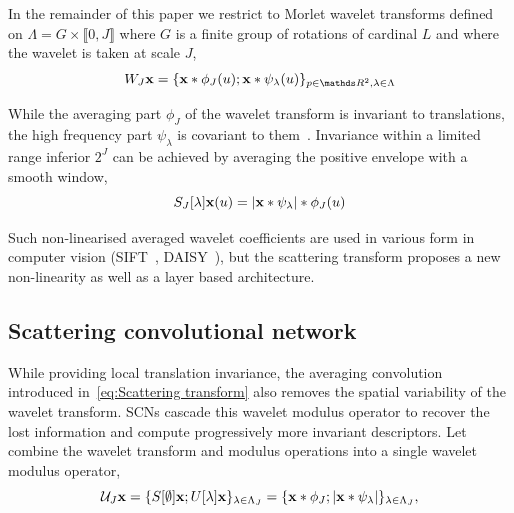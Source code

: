 \documentclass{article}
\begin{document}
    In the remainder of this paper we restrict to Morlet wavelet transforms defined on $\Lambda = G \times \llbracket 0,J \rrbracket$ where $G$ is a finite group of rotations of cardinal $L$ and where the wavelet is taken at scale $J$,
    \vspace{-5pt}
    \begin{equation}
      \label{eq:wavelet transform}
      W_{J}\bfx = \{ \bfx \ast \phi_{J}(u); \bfx \ast \psi_{\lambda}(u) \}_{p\in\dsR^{2},\lambda \in \Lambda}
    \end{equation}
    \vspace{-15pt}

    While the averaging part $\phi_{J}$ of the wavelet transform is invariant to translations, the high frequency part $\psi_{\lambda}$ is covariant to them~\citep{mallat}. Invariance within a limited range inferior $2^{J}$ can be achieved by averaging the positive envelope with a smooth window,
    \vspace{-5pt}
    \begin{equation}
      \label{eq:Scattering transform}
      S_{J}[\lambda]{\bf x}(u) = \left| {\bf x} \ast \psi_{\lambda} \right| \ast \phi_{J}(u)
    \end{equation}
    \vspace{-10pt}
    
    Such non-linearised averaged wavelet coefficients are used in various form in computer vision (SIFT~\citep{sift}, DAISY~\citep{daisy}), but the scattering transform proposes a new non-linearity as well as a layer based architecture.
  
  \subsection{Scattering convolutional network}
    \label{subsec:SCN/SCN}
    
    While providing local translation invariance, the averaging convolution introduced in~\ref{eq:Scattering transform} also removes the spatial variability of the wavelet transform. SCNs cascade this wavelet modulus operator to recover the lost information and compute progressively more invariant descriptors. Let combine the wavelet transform and modulus operations into a single wavelet modulus operator,
    \vspace{-5pt}
    \begin{equation}
      \mathcal{U}_{J} {\bf x} = \{ S[\emptyset] {\bf x} ; U[\lambda]{\bf x} \}_{\lambda \in \Lambda_{J}} 
          = \{ {\bf x} \ast \phi_{J}; \left| {\bf x} \ast \psi_{\lambda} \right| \}_{\lambda \in \Lambda_{J}},
      \label{eq:One step propagator}
    \end{equation}
    
\end{document}
